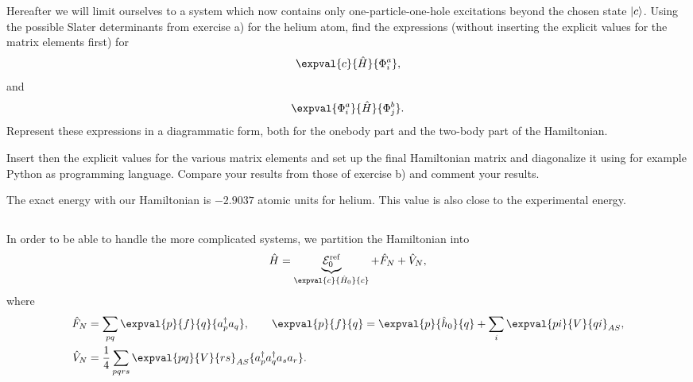 Hereafter we will limit ourselves to a system which now contains only one-particle-one-hole excitations beyond the chosen state $\lvert c\rangle$.
Using the possible Slater determinants from exercise a) for the helium atom, find the expressions (without inserting the explicit values for the matrix elements first) for %
\begin{equation*}
    \expval{c}{\hat{H}}{\Phi_i^a},
\end{equation*}
and
\begin{equation*}
    \expval{\Phi_i^a}{\hat{H}}{\Phi_j^b}.
\end{equation*}
Represent these expressions in a diagrammatic form, both for the onebody part and the two-body part of the Hamiltonian.

Insert then the explicit values for the various matrix elements and set up the final Hamiltonian matrix and diagonalize it using for example Python as programming language.
Compare your results from those of exercise b) and comment your results. %

The exact energy with our Hamiltonian is $-2.9037$ atomic units for helium.
This value is also close to the experimental energy.

\subsection{}
In order to be able to handle the more complicated systems, we partition the Hamiltonian into
\begin{equation}
    \hat{H} = \underbrace{\mathcal{E}_0^{\text{ref}}}_{\expval{c}{\hat{H}_0}{c}} + \hat{F}_N + \hat{V}_N,
\end{equation}
where
\begin{align*}
    \hat{F}_N &= \sum_{pq} \expval{p}{f}{q} \{a_p^\dagger a_q\}, \qquad
    \expval{p}{f}{q} = \expval{p}{\hat{h}_0}{q} + \sum_{i} \expval{pi}{V}{qi}_{AS}, \\
    \hat{V}_N &= \frac{1}{4} \sum_{pqrs} \expval{pq}{V}{rs}_{AS} \{a_p^\dagger a_q^\dagger a_s a_r\}.
\end{align*}

